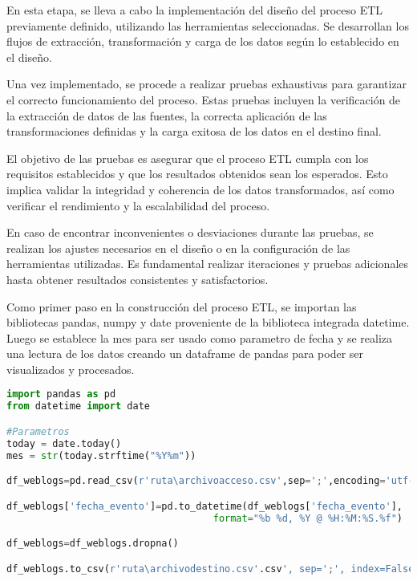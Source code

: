 En esta etapa, se lleva a cabo la implementación del diseño del proceso ETL previamente definido, utilizando las herramientas seleccionadas. Se desarrollan los flujos de extracción, transformación y carga de los datos según lo establecido en el diseño.

Una vez implementado, se procede a realizar pruebas exhaustivas para garantizar el correcto funcionamiento del proceso. Estas pruebas incluyen la verificación de la extracción de datos de las fuentes, la correcta aplicación de las transformaciones definidas y la carga exitosa de los datos en el destino final.

El objetivo de las pruebas es asegurar que el proceso ETL cumpla con los requisitos establecidos y que los resultados obtenidos sean los esperados. Esto implica validar la integridad y coherencia de los datos transformados, así como verificar el rendimiento y la escalabilidad del proceso.

En caso de encontrar inconvenientes o desviaciones durante las pruebas, se realizan los ajustes necesarios en el diseño o en la configuración de las herramientas utilizadas. Es fundamental realizar iteraciones y pruebas adicionales hasta obtener resultados consistentes y satisfactorios.

Como primer paso en la construcción del proceso ETL, se importan las bibliotecas pandas, numpy y date proveniente de la biblioteca integrada datetime. Luego se establece la mes para ser usado como parametro de fecha y se realiza una lectura de los datos creando un dataframe de pandas para poder ser visualizados y procesados.

\begin{lstlisting}[language=Python]
import pandas as pd
from datetime import date

#Parametros 
today = date.today()
mes = str(today.strftime("%Y%m"))

df_weblogs=pd.read_csv(r'ruta\archivoacceso.csv',sep=';',encoding='utf-8')

df_weblogs['fecha_evento']=pd.to_datetime(df_weblogs['fecha_evento'],
                                    format="%b %d, %Y @ %H:%M:%S.%f")

df_weblogs=df_weblogs.dropna()

df_weblogs.to_csv(r'ruta\archivodestino.csv'.csv', sep=';', index=False)
\end{lstlisting}
